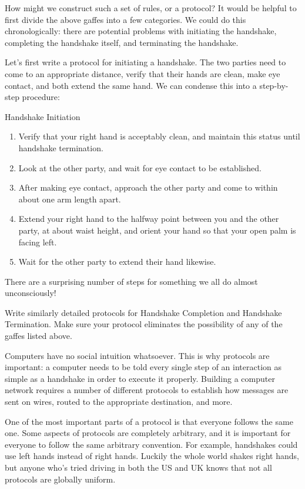 How might we construct such a set of rules, or a protocol? It would be helpful to first divide the above gaffes into a few categories. We could do this chronologically: there are potential problems with initiating the handshake, completing the handshake itself, and terminating the handshake.

Let's first write a protocol for initiating a handshake. The two parties need to come to an appropriate distance, verify that their hands are clean, make eye contact, and both extend the same hand. We can condense this into a step-by-step procedure:

\begin{graybox}
{\Large Handshake Initiation}
\begin{enumerate}
    \item Verify that your right hand is acceptably clean, and maintain this status until handshake termination.
    \item Look at the other party, and wait for eye contact to be established.
    \item After making eye contact, approach the other party and come to within about one arm length apart.
    \item Extend your right hand to the halfway point between you and the other party, at about waist height, and orient your hand so that your open palm is facing left.
    \item Wait for the other party to extend their hand likewise.
\end{enumerate}
\end{graybox}

There are a surprising number of steps for something we all do almost unconsciously! 

\begin{exercise}
    Write similarly detailed protocols for Handshake Completion and Handshake Termination. Make sure your protocol eliminates the possibility of any of the gaffes listed above.
\end{exercise}

Computers have no social intuition whatsoever. This is why protocols are important: a computer needs to be told every single step of an interaction as simple as a handshake in order to execute it properly. Building a computer network requires a number of different protocols to establish how messages are sent on wires, routed to the appropriate destination, and more.

One of the most important parts of a protocol is that everyone follows the same one. Some aspects of protocols are completely arbitrary, and it is important for everyone to follow the same arbitrary convention. For example, handshakes could use left hands instead of right hands. Luckily the whole world shakes right hands, but anyone who's tried driving in both the US and UK knows that not all protocols are globally uniform.

